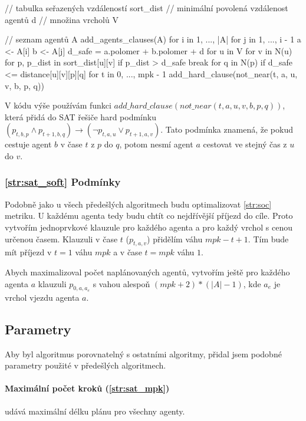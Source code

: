 \begin{code}[fontsize=\footnotesize]
// tabulka seřazených vzdáleností sort_dist
// minimální povolená vzdálenost agentů d
// množina vrcholů V

// seznam agentů A
add_agents_clauses(A)
  for i in 1, ..., |A|
    for j in 1, ..., i - 1
      a <- A[i]
      b <- A[j]
      d_safe = a.polomer + b.polomer + d
      for u in V
        for v in N(u)
          for p, p_dist in sort_dist[u][v]
            if p_dist > d_safe
              break
            for q in N(p)
              if d_safe <= distance[u][v][p][q]
                for t in 0, ..., mpk - 1
                  add_hard_clause(not_near(t, a, u, v, b, p, q))
\end{code}

V kódu výše používám funkci $add\_hard\_clause(not\_near(t, a, u, v, b, p, q))$,
která přidá do SAT řešiče hard podmínku $(p_{t,b,p} \wedge p_{t+1,b,q}) \rightarrow (\neg p_{t,a,u} \vee p_{t+1,a,v})$.
Tato podmínka znamená, že pokud cestuje agent $b$ v čase $t$ z $p$ do $q$,
potom nesmí agent $a$ cestovat ve stejný čas z $u$ do $v$.

\subsubsection{\ref{str:sat_soft} Podmínky}\label{subsubsec:sat_soft_podminky}

Podobně jako u všech předešlých algoritmech budu optimalizovat \ref{str:soc} metriku.
U každému agenta tedy budu chtít co nejdřívější příjezd do cíle.
Proto vytvořím jednoprvkové klauzule pro každého agenta a pro každý vrchol s cenou určenou časem.
Klauzuli v čase $t$ ($p_{t, a, v}$) přidělím váhu $mpk - t + 1$.
Tím bude mít příjezd v $t = 1$ váhu $mpk$ a v čase $t = mpk$ váhu $1$.

Abych maximalizoval počet naplánovaných agentů, vytvořím ještě pro každého agenta $a$
klauzuli $p_{0, a, a_e}$ s vahou alespoň $(mpk + 2) * (|A| - 1)$, kde $a_e$ je vrchol vjezdu agenta $a$.

\subsection{Parametry}\label{subsec:sat_parametry}

Aby byl algoritmus porovnatelný s ostatními algoritmy, přidal jsem podobné parametry použité v předešlých algoritmech.

\paragraph{Maximální počet kroků (\ref{str:sat_mpk})}
udává maximální délku plánu pro všechny agenty.

